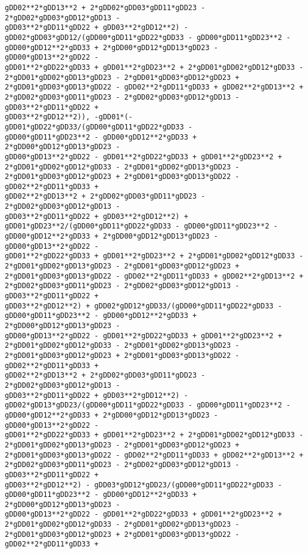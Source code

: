 \documentclass[landscape,letterpaper,10pt,english]{article}
\begin{document}
\begin{Verbatim}[commandchars=\\\{\}]
gDD02**2*gDD13**2 + 2*gDD02*gDD03*gDD11*gDD23 - 2*gDD02*gDD03*gDD12*gDD13 -
gDD03**2*gDD11*gDD22 + gDD03**2*gDD12**2) -
gDD02*gDD03*gDD12/(gDD00*gDD11*gDD22*gDD33 - gDD00*gDD11*gDD23**2 -
gDD00*gDD12**2*gDD33 + 2*gDD00*gDD12*gDD13*gDD23 - gDD00*gDD13**2*gDD22 -
gDD01**2*gDD22*gDD33 + gDD01**2*gDD23**2 + 2*gDD01*gDD02*gDD12*gDD33 -
2*gDD01*gDD02*gDD13*gDD23 - 2*gDD01*gDD03*gDD12*gDD23 +
2*gDD01*gDD03*gDD13*gDD22 - gDD02**2*gDD11*gDD33 + gDD02**2*gDD13**2 +
2*gDD02*gDD03*gDD11*gDD23 - 2*gDD02*gDD03*gDD12*gDD13 - gDD03**2*gDD11*gDD22 +
gDD03**2*gDD12**2)), -gDD01*(-gDD01*gDD22*gDD33/(gDD00*gDD11*gDD22*gDD33 -
gDD00*gDD11*gDD23**2 - gDD00*gDD12**2*gDD33 + 2*gDD00*gDD12*gDD13*gDD23 -
gDD00*gDD13**2*gDD22 - gDD01**2*gDD22*gDD33 + gDD01**2*gDD23**2 +
2*gDD01*gDD02*gDD12*gDD33 - 2*gDD01*gDD02*gDD13*gDD23 -
2*gDD01*gDD03*gDD12*gDD23 + 2*gDD01*gDD03*gDD13*gDD22 - gDD02**2*gDD11*gDD33 +
gDD02**2*gDD13**2 + 2*gDD02*gDD03*gDD11*gDD23 - 2*gDD02*gDD03*gDD12*gDD13 -
gDD03**2*gDD11*gDD22 + gDD03**2*gDD12**2) +
gDD01*gDD23**2/(gDD00*gDD11*gDD22*gDD33 - gDD00*gDD11*gDD23**2 -
gDD00*gDD12**2*gDD33 + 2*gDD00*gDD12*gDD13*gDD23 - gDD00*gDD13**2*gDD22 -
gDD01**2*gDD22*gDD33 + gDD01**2*gDD23**2 + 2*gDD01*gDD02*gDD12*gDD33 -
2*gDD01*gDD02*gDD13*gDD23 - 2*gDD01*gDD03*gDD12*gDD23 +
2*gDD01*gDD03*gDD13*gDD22 - gDD02**2*gDD11*gDD33 + gDD02**2*gDD13**2 +
2*gDD02*gDD03*gDD11*gDD23 - 2*gDD02*gDD03*gDD12*gDD13 - gDD03**2*gDD11*gDD22 +
gDD03**2*gDD12**2) + gDD02*gDD12*gDD33/(gDD00*gDD11*gDD22*gDD33 -
gDD00*gDD11*gDD23**2 - gDD00*gDD12**2*gDD33 + 2*gDD00*gDD12*gDD13*gDD23 -
gDD00*gDD13**2*gDD22 - gDD01**2*gDD22*gDD33 + gDD01**2*gDD23**2 +
2*gDD01*gDD02*gDD12*gDD33 - 2*gDD01*gDD02*gDD13*gDD23 -
2*gDD01*gDD03*gDD12*gDD23 + 2*gDD01*gDD03*gDD13*gDD22 - gDD02**2*gDD11*gDD33 +
gDD02**2*gDD13**2 + 2*gDD02*gDD03*gDD11*gDD23 - 2*gDD02*gDD03*gDD12*gDD13 -
gDD03**2*gDD11*gDD22 + gDD03**2*gDD12**2) -
gDD02*gDD13*gDD23/(gDD00*gDD11*gDD22*gDD33 - gDD00*gDD11*gDD23**2 -
gDD00*gDD12**2*gDD33 + 2*gDD00*gDD12*gDD13*gDD23 - gDD00*gDD13**2*gDD22 -
gDD01**2*gDD22*gDD33 + gDD01**2*gDD23**2 + 2*gDD01*gDD02*gDD12*gDD33 -
2*gDD01*gDD02*gDD13*gDD23 - 2*gDD01*gDD03*gDD12*gDD23 +
2*gDD01*gDD03*gDD13*gDD22 - gDD02**2*gDD11*gDD33 + gDD02**2*gDD13**2 +
2*gDD02*gDD03*gDD11*gDD23 - 2*gDD02*gDD03*gDD12*gDD13 - gDD03**2*gDD11*gDD22 +
gDD03**2*gDD12**2) - gDD03*gDD12*gDD23/(gDD00*gDD11*gDD22*gDD33 -
gDD00*gDD11*gDD23**2 - gDD00*gDD12**2*gDD33 + 2*gDD00*gDD12*gDD13*gDD23 -
gDD00*gDD13**2*gDD22 - gDD01**2*gDD22*gDD33 + gDD01**2*gDD23**2 +
2*gDD01*gDD02*gDD12*gDD33 - 2*gDD01*gDD02*gDD13*gDD23 -
2*gDD01*gDD03*gDD12*gDD23 + 2*gDD01*gDD03*gDD13*gDD22 - gDD02**2*gDD11*gDD33 +

\end{Verbatim}
\end{document}
